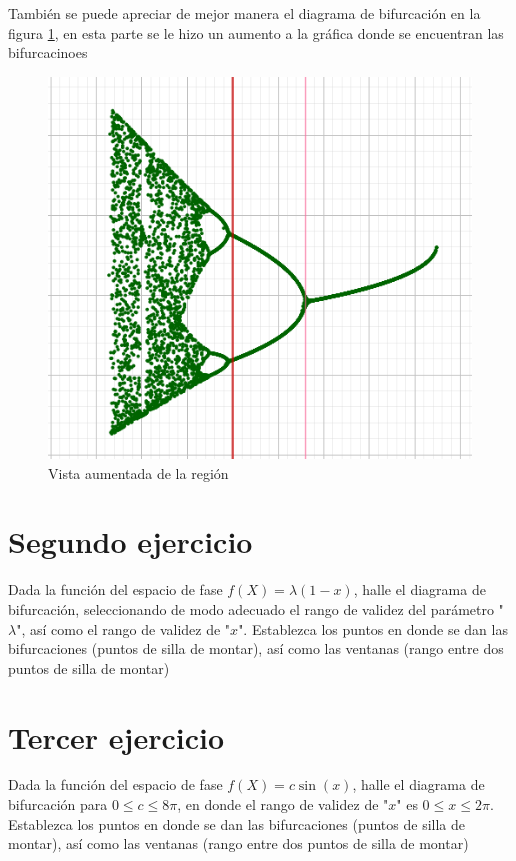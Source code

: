 \documentclass[11pt]{report}
\theoremstyle{plain}
\theoremstyle{definition}
\begin{document}
También se puede apreciar de mejor manera el diagrama de bifurcación en la figura \ref{fig:Eje1_3}, en esta parte se le hizo un aumento a la gráfica donde se encuentran las bifurcacinoes
\begin{figure}[!h] %
	\centering
	\includegraphics[scale=0.3]{caos_1_3.png}
	\caption{Vista aumentada de la región}
	\label{fig:Eje1_3}
\end{figure}
\section{Segundo ejercicio}
Dada la función del espacio de fase $f(X) = \lambda (1-x)$, halle el diagrama de bifurcación, seleccionando de modo adecuado el rango de validez del parámetro "$\lambda$", así como el rango de validez de "$x$". Establezca los puntos en donde se dan las bifurcaciones (puntos de silla de montar), así como las ventanas (rango entre dos puntos de silla de montar)
\section{Tercer ejercicio}
Dada la función del espacio de fase $f(X) = c\sin(x)$, halle el diagrama de bifurcación para $0\leq c \leq 8\pi$, en donde el rango de validez de "$x$" es $0\leq x \leq 2\pi$. Establezca los puntos en donde se dan las bifurcaciones (puntos de silla de montar), así como las ventanas (rango entre dos puntos de silla de montar)
\end{document}
